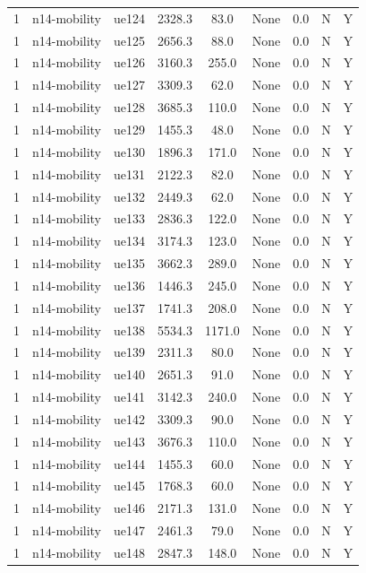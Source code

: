 \begin{table}[ht]
\begin{tabular}{|c|c|c|c|c|c|c|c|c|}
1 & n14-mobility & ue124 & 2328.3 & 83.0 & None & 0.0 & N & Y \\
1 & n14-mobility & ue125 & 2656.3 & 88.0 & None & 0.0 & N & Y \\
1 & n14-mobility & ue126 & 3160.3 & 255.0 & None & 0.0 & N & Y \\
1 & n14-mobility & ue127 & 3309.3 & 62.0 & None & 0.0 & N & Y \\
1 & n14-mobility & ue128 & 3685.3 & 110.0 & None & 0.0 & N & Y \\
1 & n14-mobility & ue129 & 1455.3 & 48.0 & None & 0.0 & N & Y \\
1 & n14-mobility & ue130 & 1896.3 & 171.0 & None & 0.0 & N & Y \\
1 & n14-mobility & ue131 & 2122.3 & 82.0 & None & 0.0 & N & Y \\
1 & n14-mobility & ue132 & 2449.3 & 62.0 & None & 0.0 & N & Y \\
1 & n14-mobility & ue133 & 2836.3 & 122.0 & None & 0.0 & N & Y \\
1 & n14-mobility & ue134 & 3174.3 & 123.0 & None & 0.0 & N & Y \\
1 & n14-mobility & ue135 & 3662.3 & 289.0 & None & 0.0 & N & Y \\
1 & n14-mobility & ue136 & 1446.3 & 245.0 & None & 0.0 & N & Y \\
1 & n14-mobility & ue137 & 1741.3 & 208.0 & None & 0.0 & N & Y \\
1 & n14-mobility & ue138 & 5534.3 & 1171.0 & None & 0.0 & N & Y \\
1 & n14-mobility & ue139 & 2311.3 & 80.0 & None & 0.0 & N & Y \\
1 & n14-mobility & ue140 & 2651.3 & 91.0 & None & 0.0 & N & Y \\
1 & n14-mobility & ue141 & 3142.3 & 240.0 & None & 0.0 & N & Y \\
1 & n14-mobility & ue142 & 3309.3 & 90.0 & None & 0.0 & N & Y \\
1 & n14-mobility & ue143 & 3676.3 & 110.0 & None & 0.0 & N & Y \\
1 & n14-mobility & ue144 & 1455.3 & 60.0 & None & 0.0 & N & Y \\
1 & n14-mobility & ue145 & 1768.3 & 60.0 & None & 0.0 & N & Y \\
1 & n14-mobility & ue146 & 2171.3 & 131.0 & None & 0.0 & N & Y \\
1 & n14-mobility & ue147 & 2461.3 & 79.0 & None & 0.0 & N & Y \\
1 & n14-mobility & ue148 & 2847.3 & 148.0 & None & 0.0 & N & Y \\

\end{tabular}
\end{table}
